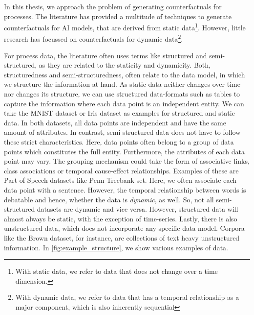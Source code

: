 \documentclass[./../../paper.tex]{subfiles}
\begin{document}
In this thesis, we approach the problem of generating counterfactuals for processes. The literature has provided a multitude of techniques to generate counterfactuals for AI models, that are derived from static data\footnote{With static data, we refer to data that does not change over a time dimension.}. However, little research has focussed on counterfactuals for dynamic data\footnote{With dynamic data, we refer to data that has a temporal relationship as a major component, which is also inherently sequential}.  

For process data, the literature often uses terms like structured and semi-structured, as they are related to the staticity and dynamicity. Both, structuredness and semi-structuredness, often relate to the data model, in which we structure the information at hand. As static data neither changes over time nor changes its structure, we can use structured data-formats such as tables to capture the information where each data point is an independent entity. We can take the MNIST dataset\autocite{deng_MNISTDatabaseHandwritten_2012} or Iris dataset\autocites{anderson_SpeciesProblemIris_1936,fisher_UseMultipleMeasurements_1936} as examples for structured and static data. In both datasets, all data points are independent and have the same amount of attributes. In contrast, semi-structured data does not have to follow these strict characteristics. Here, data points often belong to a group of data points which constitutes the full entity. Furthermore, the attributes of each data point may vary. The grouping mechanism could take the form of associative links, class associations or temporal cause-effect relationships. Examples of these are Part-of-Speech datasets like Penn Treebank set\autocite{marcus_Buildinglargeannotated_1993}. Here, we often associate each data point with a sentence. However, the temporal relationship between words is debatable and hence, whether the data is \emph{dynamic}, as well. So, not all semi-structured datasets are dynamic and vice versa. However, structured data will almost always be static, with the exception of time-series. Lastly, there is also unstructured data, which does not incorporate any specific data model. Corpora like the Brown dataset\autocite{francis79browncorpus}, for instance, are collections of text heavy unstructured information. In \autoref{fig:example_structure}, we show various examples of data.
\end{document}
